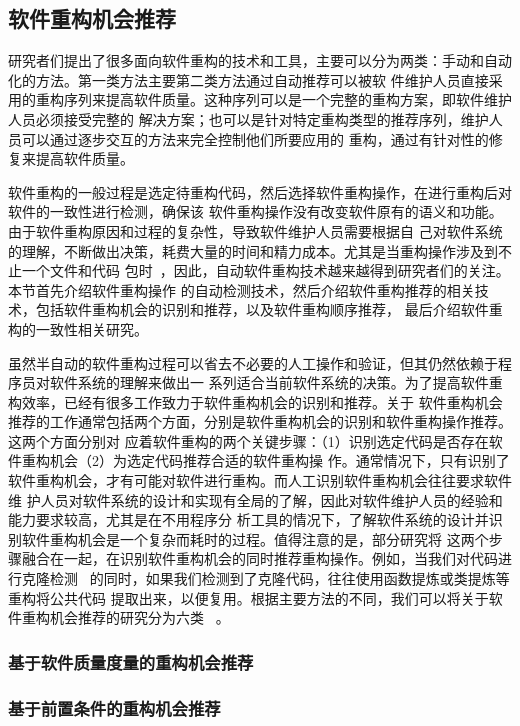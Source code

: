 \subsection{软件重构机会推荐}

研究者们提出了很多面向软件重构的技术和工具，主要可以分为两类：手动和自动化的方法。第一类方法主要第二类方法通过自动推荐可以被软
件维护人员直接采用的重构序列来提高软件质量\cite{harman2007pareto, kessentini2011design,
ouni2013maintainability, Silva2014}。这种序列可以是一个完整的重构方案，即软件维护人员必须接受完整的
解决方案；也可以是针对特定重构类型的推荐序列，维护人员可以通过逐步交互的方法来完全控制他们所要应用的
重构，通过有针对性的修复来提高软件质量。

软件重构的一般过程是选定待重构代码，然后选择软件重构操作，在进行重构后对软件的一致性进行检测，确保该
软件重构操作没有改变软件原有的语义和功能。由于软件重构原因和过程的复杂性，导致软件维护人员需要根据自
己对软件系统的理解，不断做出决策，耗费大量的时间和精力成本。尤其是当重构操作涉及到不止一个文件和代码
包时~\cite{liu2013monitor}，因此，自动软件重构技术越来越得到研究者们的关注。本节首先介绍软件重构操作
的自动检测技术，然后介绍软件重构推荐的相关技术，包括软件重构机会的识别和推荐，以及软件重构顺序推荐，
最后介绍软件重构的一致性相关研究。


虽然半自动的软件重构过程可以省去不必要的人工操作和验证，但其仍然依赖于程序员对软件系统的理解来做出一
系列适合当前软件系统的决策。为了提高软件重构效率，已经有很多工作致力于软件重构机会的识别和推荐。关于
软件重构机会推荐的工作通常包括两个方面，分别是软件重构机会的识别和软件重构操作推荐。这两个方面分别对
应着软件重构的两个关键步骤：（1）识别选定代码是否存在软件重构机会（2）为选定代码推荐合适的软件重构操
作。通常情况下，只有识别了软件重构机会，才有可能对软件进行重构。而人工识别软件重构机会往往要求软件维
护人员对软件系统的设计和实现有全局的了解，因此对软件维护人员的经验和能力要求较高，尤其是在不用程序分
析工具的情况下，了解软件系统的设计并识别软件重构机会是一个复杂而耗时的过程。值得注意的是，部分研究将
这两个步骤融合在一起，在识别软件重构机会的同时推荐重构操作。例如，当我们对代码进行克隆检测
~\cite{kamiya2002ccfinder}的同时，如果我们检测到了克隆代码，往往使用函数提炼或类提炼等重构将公共代码
提取出来，以便复用。根据主要方法的不同，我们可以将关于软件重构机会推荐的研究分为六类
~\cite{al2015identifying}。

 
\iffalse
\subsubsection{基于软件质量度量的重构机会推荐}
\subsubsection{基于前置条件的重构机会推荐}
